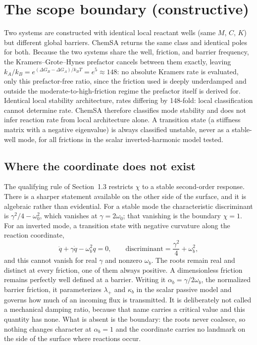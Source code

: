 \section{The scope boundary (constructive)}

Two systems are constructed with identical local reactant wells (same \(M\), \(C\), \(K\)) but different global barriers. ChemSA returns the same class and identical poles for both. Because the two systems share the well, friction, and barrier frequency, the Kramers--Grote--Hynes prefactor cancels between them exactly, leaving \(k_A/k_B = e^{(\Delta G_B - \Delta G_A)/k_BT} = e^{5} \approx 148\): no absolute Kramers rate is evaluated, only this prefactor-free ratio, since the friction used is deeply underdamped and outside the moderate-to-high-friction regime the prefactor itself is derived for. Identical local stability architecture, rates differing by 148-fold: local classification cannot determine rate. ChemSA therefore classifies mode stability and does not infer reaction rate from local architecture alone. A transition state (a stiffness matrix with a negative eigenvalue) is always classified unstable, never as a stable-well mode, for all frictions in the scalar inverted-harmonic model tested.

\subsection*{Where the coordinate does not exist}

The qualifying rule of Section~1.3 restricts \(\chi\) to a stable second-order response. There is a sharper statement available on the other side of the surface, and it is algebraic rather than evidential. For a stable mode the characteristic discriminant is \(\gamma^2/4 - \omega_0^2\), which vanishes at \(\gamma = 2\omega_0\); that vanishing is the boundary \(\chi = 1\). For an inverted mode, a transition state with negative curvature along the reaction coordinate,
\[
\ddot q + \gamma \dot q - \omega_b^2 q = 0, \qquad \text{discriminant} = \frac{\gamma^2}{4} + \omega_b^2 ,
\]
and this cannot vanish for real \(\gamma\) and nonzero \(\omega_b\). The roots remain real and distinct at every friction, one of them always positive. A dimensionless friction remains perfectly well defined at a barrier. Writing it \(\alpha_b = \gamma/2\omega_b\), the normalized barrier friction, it parameterizes \(\lambda_+\) and \(\kappa_b\) in the scalar passive model and governs how much of an incoming flux is transmitted. It is deliberately not called a mechanical damping ratio, because that name carries a critical value and this quantity has none. What is absent is the boundary: the roots never coalesce, so nothing changes character at \(\alpha_b = 1\) and the coordinate carries no landmark on the side of the surface where reactions occur.

